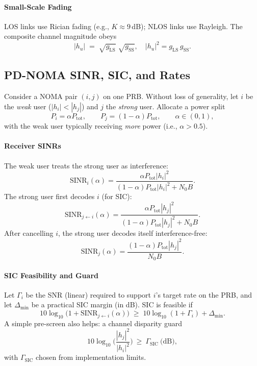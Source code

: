 \paragraph*{Small-Scale Fading}
LOS links use Rician fading (e.g., $K\!\approx\!9$\,dB); NLOS links use Rayleigh. The composite channel magnitude obeys
\[
|h_u| \;=\; \sqrt{g_{\mathrm{LS}}}\;\sqrt{g_{\mathrm{SS}}},\quad |h_u|^2 = g_{\mathrm{LS}}\,g_{\mathrm{SS}}.
\]

\subsection{PD-NOMA SINR, SIC, and Rates}
Consider a NOMA pair $(i,j)$ on one PRB. Without loss of generality, let $i$ be the \emph{weak} user ($|h_i|<|h_j|$) and $j$ the \emph{strong} user. Allocate a power split
\[
P_i = \alpha P_{\mathrm{tot}},\qquad P_j = (1-\alpha)P_{\mathrm{tot}},\qquad \alpha\in(0,1),
\]
with the weak user typically receiving \emph{more} power (i.e., $\alpha>0.5$).

\paragraph*{Receiver SINRs}
The weak user treats the strong user as interference:
\[
\mathrm{SINR}_i(\alpha)=\frac{\alpha P_{\mathrm{tot}}|h_i|^2}{(1-\alpha)P_{\mathrm{tot}}|h_i|^2 + N_0 B}.
\]
The strong user first decodes $i$ (for SIC):
\[
\mathrm{SINR}_{j\leftarrow i}(\alpha)=\frac{\alpha P_{\mathrm{tot}}|h_j|^2}{(1-\alpha)P_{\mathrm{tot}}|h_j|^2 + N_0 B}.
\]
After cancelling $i$, the strong user decodes itself interference-free:
\[
\mathrm{SINR}_j(\alpha)=\frac{(1-\alpha)P_{\mathrm{tot}}|h_j|^2}{N_0 B}.
\]

\paragraph*{SIC Feasibility and Guard}
Let $\Gamma_i$ be the SNR (linear) required to support $i$’s target rate on the PRB, and let $\Delta_{\min}$ be a practical SIC margin (in dB). SIC is feasible if
\[
10\log_{10}\!\big(1+\mathrm{SINR}_{j\leftarrow i}(\alpha)\big) \;\ge\; 10\log_{10}(1+\Gamma_i) + \Delta_{\min}.
\]
A simple pre-screen also helps: a channel disparity guard
\[
10\log_{10}\!\Big(\frac{|h_j|^2}{|h_i|^2}\Big)\ \ge\ \Gamma_{\mathrm{SIC}}\ \text{(dB)},
\]
with $\Gamma_{\mathrm{SIC}}$ chosen from implementation limits.

